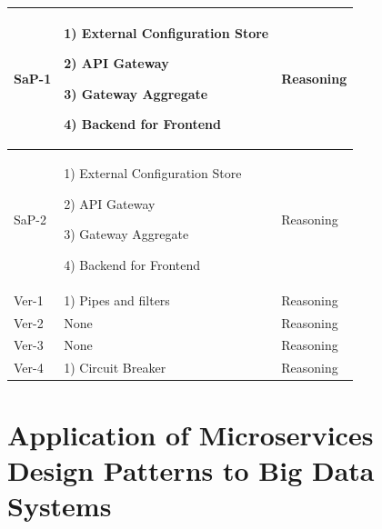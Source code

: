 \documentclass[conference]{IEEEtran}
\begin{document}
\begin{center}
\begin{table}
\begin{tabular}{ | m{2cm} | m{8cm} |  m{2cm} |}
        SaP-1 &  

        1) External Configuration Store

        2) API Gateway

        3) Gateway Aggregate

        4) Backend for Frontend 
        
        & Reasoning
        
        \\
        \hline

        SaP-2 &  

        1) External Configuration Store

        2) API Gateway

        3) Gateway Aggregate

        4) Backend for Frontend 
        
        & Reasoning
        
        \\
        \hline

        Ver-1 &  

        1) Pipes and filters
        
        & Reasoning
        
        \\
        \hline

        Ver-2 &  
        None 
        & Reasoning
        
        \\
        \hline

        
        Ver-3 &  
        
        None

        & Reasoning
        
        \\
        \hline

             
        Ver-4 &  
        
        1) Circuit Breaker

        & Reasoning
        
        \\
        \hline

    \end{tabular}
    \end{table}
\end{center}


\section{Application of Microservices Design Patterns to Big Data Systems}
\end{document}

